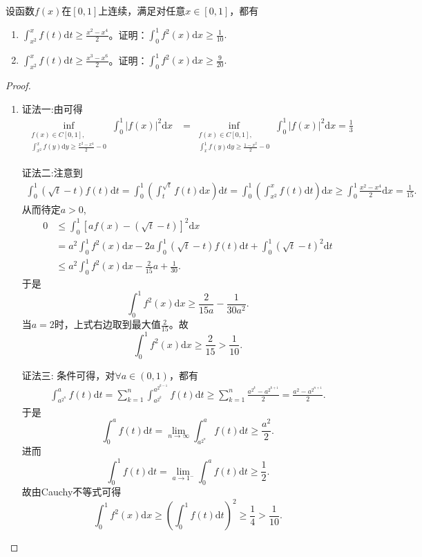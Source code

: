 \documentclass[../../main.tex]{subfiles}%
\begin{document}
\begin{example}
设函数$f(x)$在$[0,1]$上连续，满足对任意$x \in [0,1]$，都有
\begin{enumerate}
\item $\int_{x^2}^{x} f(t)\mathrm{d}t \geqslant \frac{x^2 - x^4}{2}$。证明：$\int_{0}^{1} f^2(x)\mathrm{d}x \geqslant  \frac{1}{10}.$

\item $\int_{x^2}^{x} f(t)\mathrm{d}t \geqslant  \frac{x^3 - x^6}{2}$。证明：$\int_{0}^{1} f^2(x)\mathrm{d}x \geqslant  \frac{9}{20}.$
\end{enumerate}
\end{example}
\begin{proof}
\begin{enumerate}
\item {\color{blue}证法一:}由可得
\begin{align*}
\inf_{\substack{f(x) \in C[0,1], \\ \int_{x^2}^x f(y) \mathrm{d}y \geqslant \frac{x^2 - x^4}{2} - 0}} \int_0^1 |f(x)|^2 \mathrm{d}x &= \inf_{\substack{f(x) \in C[0,1], \\ \int_x^1 f(y) \mathrm{d}y \geqslant \frac{1 - x^2}{2} - 0}} \int_0^1 |f(x)|^2 \mathrm{d}x = \frac{1}{3}
\end{align*}

{\color{blue}证法二:}注意到
\begin{align*}
\int_0^1 \left( \sqrt{t} - t \right) f(t) \mathrm{d}t = \int_0^1 \left( \int_t^{\sqrt{t}} f(t) \mathrm{d}x \right) \mathrm{d}t = \int_0^1 \left( \int_{x^2}^x f(t) \mathrm{d}t \right) \mathrm{d}x \geqslant \int_0^1 \frac{x^2 - x^4}{2} \mathrm{d}x = \frac{1}{15}.
\end{align*}
从而待定$a > 0$,
\begin{align*}
0 &\leqslant \int_0^1 \left[ a f(x) - \left( \sqrt{t} - t \right) \right]^2 \mathrm{d}x \\
&= a^2 \int_0^1 f^2(x) \mathrm{d}x - 2a \int_0^1 \left( \sqrt{t} - t \right) f(t) \mathrm{d}t + \int_0^1 \left( \sqrt{t} - t \right)^2 \mathrm{d}t \\
&\leqslant a^2 \int_0^1 f^2(x) \mathrm{d}x - \frac{2}{15}a + \frac{1}{30}.
\end{align*}
于是
\[
\int_0^1 f^2(x) \mathrm{d}x \geqslant \frac{2}{15a} - \frac{1}{30a^2}.
\]
当$a = 2$时，上式右边取到最大值$\frac{2}{15}$。故
\[
\int_0^1 f^2(x) \mathrm{d}x \geqslant \frac{2}{15} > \frac{1}{10}.
\]

{\color{blue}证法三:}
条件可得，对$\forall a \in (0,1)$，都有
\begin{align*}
\int_{a^{2^n}}^a f(t) \mathrm{d}t = \sum_{k=1}^n \int_{a^{2^k}}^{a^{2^{k-1}}} f(t) \mathrm{d}t \geqslant \sum_{k=1}^n \frac{a^{2^k} - a^{2^{k+1}}}{2} = \frac{a^2 - a^{2^{n+1}}}{2}.
\end{align*}
于是
\[
\int_0^a f(t) \mathrm{d}t = \lim_{n \to \infty} \int_{a^{2^n}}^a f(t) \mathrm{d}t \geqslant \frac{a^2}{2}.
\]
进而
\[
\int_0^1 f(t) \mathrm{d}t = \lim_{a \to 1^-} \int_0^a f(t) \mathrm{d}t \geqslant \frac{1}{2}.
\]
故由Cauchy不等式可得
\[
\int_0^1 f^2(x) \mathrm{d}x \geqslant \left( \int_0^1 f(t) \mathrm{d}t \right)^2 \geqslant \frac{1}{4} > \frac{1}{10}.
\]


\end{enumerate}
\end{proof}
\end{document}
